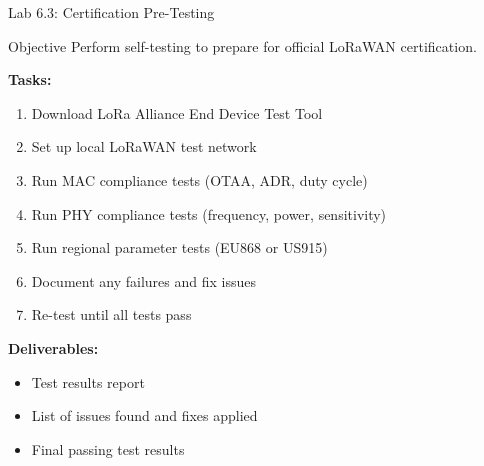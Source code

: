 \documentclass{beamer}
\begin{document}
\begin{frame}{Lab 6.3: Certification Pre-Testing}
\begin{block}{Objective}
Perform self-testing to prepare for official LoRaWAN certification.
\end{block}

\textbf{Tasks:}
\begin{enumerate}
    \item Download LoRa Alliance End Device Test Tool
    \item Set up local LoRaWAN test network
    \item Run MAC compliance tests (OTAA, ADR, duty cycle)
    \item Run PHY compliance tests (frequency, power, sensitivity)
    \item Run regional parameter tests (EU868 or US915)
    \item Document any failures and fix issues
    \item Re-test until all tests pass
\end{enumerate}

\vspace{0.3cm}

\textbf{Deliverables:}
\begin{itemize}
    \item Test results report
    \item List of issues found and fixes applied
    \item Final passing test results
\end{itemize}
\end{frame}
\end{document}
